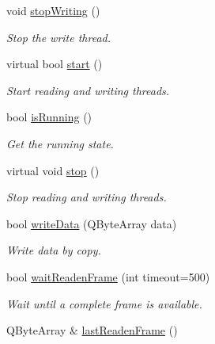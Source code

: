 \begin{DoxyCompactItemize}
void \hyperlink{classmdt_port_manager_a29b0d41eb5b72ef58031e4b7c96bb7e5}{stopWriting} ()
\begin{DoxyCompactList}\small\item\em Stop the write thread. \end{DoxyCompactList}\item 
virtual bool \hyperlink{classmdt_port_manager_af1fb103ffafc227337a59c7e82f44fbc}{start} ()
\begin{DoxyCompactList}\small\item\em Start reading and writing threads. \end{DoxyCompactList}\item 
bool \hyperlink{classmdt_port_manager_af460167e604b8b6e2e933a98b2b6b5a2}{isRunning} ()
\begin{DoxyCompactList}\small\item\em Get the running state. \end{DoxyCompactList}\item 
virtual void \hyperlink{classmdt_port_manager_aacbf87cc3d9c37c87e21696f8a6514bd}{stop} ()
\begin{DoxyCompactList}\small\item\em Stop reading and writing threads. \end{DoxyCompactList}\item 
bool \hyperlink{classmdt_port_manager_a6d3cc4e522326e2a6ca0da401ae58271}{writeData} (QByteArray data)
\begin{DoxyCompactList}\small\item\em Write data by copy. \end{DoxyCompactList}\item 
bool \hyperlink{classmdt_port_manager_a44ca338c8c56893612301e09d2ee6e88}{waitReadenFrame} (int timeout=500)
\begin{DoxyCompactList}\small\item\em Wait until a complete frame is available. \end{DoxyCompactList}\item 
\hypertarget{classmdt_port_manager_ac289078134036e05eaa3eabc6799443a}{
QByteArray \& \hyperlink{classmdt_port_manager_ac289078134036e05eaa3eabc6799443a}{lastReadenFrame} ()}
\label{classmdt_port_manager_ac289078134036e05eaa3eabc6799443a}


\end{DoxyCompactItemize}
